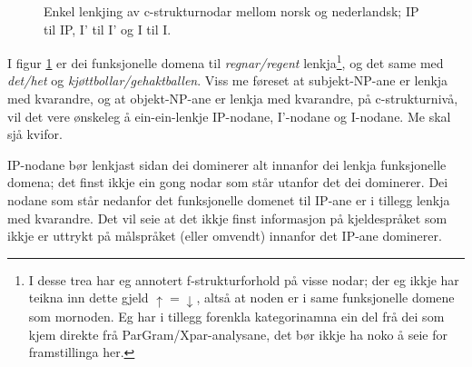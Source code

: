 \documentclass[11pt,a4paper,oneside,draft]{book}
\newcommand{\proj}[2]{\begin{tabular}{c}\footnotesize{#1}\\\normalsize{#2}\end{tabular}}
\newcommand{\ua}{\ensuremath{\uparrow}}
\newcommand{\da}{\ensuremath{\downarrow}}
\begin{document}
\begin{figure}[htp]
\centering
   \caption{Enkel lenkjing av c-strukturnodar mellom norsk og
   nederlandsk; IP til IP, I' til I' og I til I.}
   \label{fig:enkel-c-lenkje}
  \end{figure}

I figur \ref{fig:enkel-c-lenkje} er dei funksjonelle domena til \emph{regnar/regent} 
lenkja\footnote{I desse trea har eg annotert f-strukturforhold på visse nodar;
       der eg ikkje har teikna inn dette gjeld $\ua=\da$, altså at
       noden er i same funksjonelle domene som mornoden. Eg har i
       tillegg forenkla kategorinamna ein del frå dei som kjem direkte
       frå ParGram/Xpar-analysane, det bør ikkje ha noko å seie for
       framstillinga her. }, og det same med \emph{det/het} og \emph{kjøttbollar/gehaktballen}. 
Viss me føreset at subjekt-NP-ane er lenkja med kvarandre, og at
objekt-NP-ane er lenkja med kvarandre, på c-strukturnivå,
vil det vere ønskeleg å ein-ein-lenkje IP-nodane, I'-nodane og
I-nodane. Me skal sjå kvifor.

IP-nodane bør lenkjast sidan dei dominerer alt innanfor dei
lenkja funksjonelle domena; det finst ikkje ein gong nodar som står
utanfor det dei dominerer. Dei nodane som står nedanfor det funksjonelle
domenet til IP-ane er i tillegg lenkja med kvarandre. Det vil seie at
det ikkje finst informasjon på kjeldespråket som ikkje er uttrykt på
målspråket (eller omvendt) innanfor det IP-ane dominerer.
\end{document}
